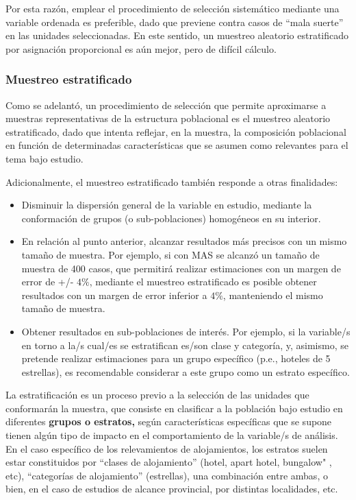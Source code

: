 \documentclass[
]{book}
\begin{document}
Por esta razón, emplear el procedimiento de selección sistemático mediante una variable ordenada es preferible, dado que previene contra casos de ``mala suerte'' en las unidades seleccionadas. En este sentido, un muestreo aleatorio estratificado por asignación proporcional es aún mejor, pero de difícil cálculo.

\hypertarget{muestreo-estratificado}{%
\subsubsection{Muestreo estratificado}\label{muestreo-estratificado}}

Como se adelantó, un procedimiento de selección que permite aproximarse a muestras representativas de la estructura poblacional es el muestreo aleatorio estratificado, dado que intenta reflejar, en la muestra, la composición poblacional en función de determinadas características que se asumen como relevantes para el tema bajo estudio.

Adicionalmente, el muestreo estratificado también responde a otras finalidades:

\begin{itemize}
\item
  Disminuir la dispersión general de la variable en estudio, mediante la conformación de grupos (o sub-poblaciones) homogéneos en su interior.
\item
  En relación al punto anterior, alcanzar resultados más precisos con un mismo tamaño de muestra. Por ejemplo, si con MAS se alcanzó un tamaño de muestra de 400 casos, que permitirá realizar estimaciones con un margen de error de +/- \(4\%\), mediante el muestreo estratificado es posible obtener resultados con un margen de error inferior a \(4\%\), manteniendo el mismo tamaño de muestra.
\item
  Obtener resultados en sub-poblaciones de interés. Por ejemplo, si la variable/s en torno a la/s cual/es se estratifican es/son clase y categoría, y, asimismo, se pretende realizar estimaciones para un grupo específico (p.e., hoteles de 5 estrellas), es recomendable considerar a este grupo como un estrato específico.
\end{itemize}

La estratificación es un proceso previo a la selección de las unidades que conformarán la muestra, que consiste en clasificar a la población bajo estudio en diferentes \textbf{grupos o estratos,} según características específicas que se supone tienen algún tipo de impacto en el comportamiento de la variable/s de análisis. En el caso específico de los relevamientos de alojamientos, los estratos suelen estar constituidos por ``clases de alojamiento'' (hotel, apart hotel, bungalow" , etc), ``categorías de alojamiento'' (estrellas), una combinación entre ambas, o bien, en el caso de estudios de alcance provincial, por distintas localidades, etc.
\end{document}
